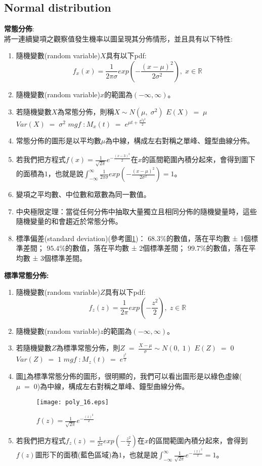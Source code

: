 \documentclass[12pt, a4paper]{article}
\begin{document}
\subsection{Normal distribution}
\textbf{常態分佈}\;:\\
將一連續變項之觀察值發生機率以圖呈現其分佈情形，並且具有以下特性:
\begin{enumerate}
\item 隨機變數(random variable)\;$X$\;具有以下pdf\;:
$$f_x(x) = \frac{1}{2\pi \sigma} exp(-\frac{(x-\mu)^2}{2\sigma ^2}),\; x \in \mathbb{R}$$
\item 隨機變數(random variable)\;$x$\;的範圍為\;$(-\infty, \infty)$\;。
\item 若隨機變數\;$X$\;為常態分佈，則稱\;$X\sim N(\mu,\;\sigma ^2)$\;
\subitem $E(X)\;=\;\mu$
\subitem $Var(X)\;=\;\sigma ^2$
\subitem $mgf\;:M_x(t)\;=\;e^{\mu t+\frac{\sigma ^2 t^2}{2}}$
\item 常態分佈的圖形是以平均數\;$\mu$\;為中線，構成左右對稱之單峰、鐘型曲線分佈。
\item 若我們把方程式\;$f(x) = \frac{1}{\sqrt{2\pi}}e^{-\frac{(x-3)^2}{2}}$\;在\;$x$\;的區間範圍內積分起來，會得到圖下的面積為\;$1$\;，也就是說\;$\int_{-\infty}^{\infty} \frac{1}{2\pi \sigma} exp(-\frac{(x-\mu)^2}{2\sigma ^2})=1$\;。
\item 變項之平均數、中位數和眾數為同一數值。
\item 中央極限定理：當從任何分佈中抽取大量獨立且相同分佈的隨機變量時，這些隨機變量的和會趨近於常態分佈。
\item 標準偏差(standard deviation)(參考圖\;\ref{fig:poly_16.eps})：
\subitem $68.3\%$\;的數值，落在平均數 ± 1個標準差間；
\subitem $95.4\%$\;的數值，落在平均數 ± 2個標準差間；
\subitem $99.7\%$\;的數值，落在平均數 ± 3個標準差間。\\
\end{enumerate}

\textbf{標準常態分佈\;:}
\begin{enumerate}
\item 隨機變數(random variable)\;$Z$\;具有以下pdf\;:
$$f_z(z) = \frac{1}{2\pi} exp(-\frac{z^2}{2}),\; z \in \mathbb{R}$$
\item 隨機變數(random variable)\;$z$\;的範圍為\;$(-\infty, \infty)$\;。
\item 若隨機變數\;$Z$\;為標準常態分佈，則\;$Z\;=\;\frac{X-\mu}{\sigma}\sim N(0,\; 1)$\;
\subitem $E(Z)\;=\;0$
\subitem $Var(Z)\;=\;1$
\subitem $mgf\;:M_z(t)\;=\;e^{\frac{t^2}{2}}$
\item 圖\;\ref{fig:poly_16.eps}\;為標準常態分佈的圖形，很明顯的，我們可以看出圖形是以綠色虛線(\;$\mu\;=\;0$\;)為中線，構成左右對稱之單峰、鐘型曲線分佈。
\begin{figure}[h]
\centering
\texttt{[image: poly\_16.eps]}
\caption{$f(z) = \frac{1}{\sqrt{2\pi}}e^{-\frac{(z)^2}{2}}$}
\label{fig:poly_16.eps}
\end{figure}
\item 若我們把方程式\;$f_z(z) = \frac{1}{2\pi} exp(-\frac{z^2}{2})$\;在\;$x$\;的區間範圍內積分起來，會得到\;$f(z)$\;圖形下的面積(藍色區域)為\;$1$\;，也就是說\;$\int_{-\infty}^{\infty} \frac{1}{\sqrt{2\pi}}e^{-\frac{(z)^2}{2}}=1$\;。
\end{enumerate}
\end{document}
